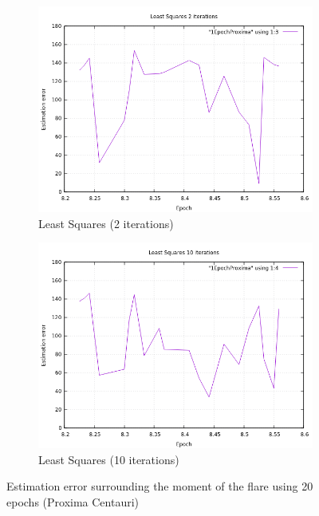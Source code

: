 \begin{figure}[!htb]
\begin{subfigure}[b]{0.5\textwidth}
	\end{subfigure}
	\hfill
	\begin{subfigure}[b]{0.5\textwidth}
		\includegraphics[width=\linewidth]{images/resultsStellar/20Epochs1Epoch/1EpochProximaLS2.png}
		\caption{Least Squares (2 iterations)}
	\end{subfigure}
	\hfill
	\begin{subfigure}[b]{0.5\textwidth}
		\includegraphics[width=\linewidth]{images/resultsStellar/20Epochs1Epoch/1EpochProximaLS10.png}
		\caption{Least Squares (10 iterations)}
	\end{subfigure}
	\caption{Estimation error surrounding the moment of the flare using 20 epochs (Proxima Centauri)}
	\label{fig:proximaCentauri1Epoch20}
\end{figure}

